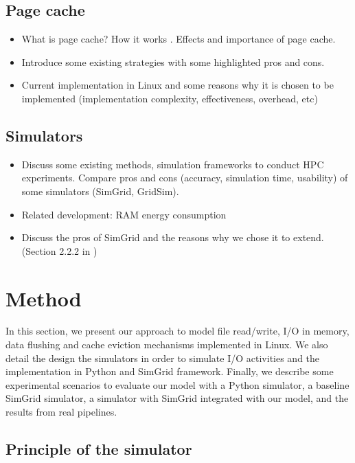 \documentclass[conference]{IEEEtran}
\begin{document}
		\subsection{Page cache}
			\begin{itemize}
				\item What is page cache? How it works \cite{linuxdev3rd2010}. Effects and importance of page cache.
				\item Introduce some existing strategies with some highlighted pros and cons.
				\item Current implementation in Linux and some reasons why it is chosen to be implemented (implementation complexity, effectiveness, overhead, etc) \cite{linuxdev3rd2010}
			\end{itemize}									

		\subsection{Simulators}
			\begin{itemize}
				\item Discuss some existing methods, simulation frameworks to conduct HPC experiments. Compare pros and cons (accuracy, simulation time, usability) of some simulators (SimGrid, GridSim).
				\item Related development: RAM energy consumption \cite{gill2019} \cite{ouarnoughi2017} 
				\item Discuss the pros of SimGrid and the reasons why we chose it to extend. (Section 2.2.2 in \cite{casanova2014})
			\end{itemize}
			
	\section{Method}
		In this section, we present our approach to model file read/write, 
		I/O in memory, data flushing and cache eviction mechanisms 
		implemented in Linux. 
		We also detail the design the simulators in order to simulate I/O activities 
		and the implementation in Python and SimGrid framework. 
		Finally, we describe some experimental scenarios to evaluate our model 
		with a Python simulator, a baseline SimGrid simulator, a simulator 
		with SimGrid integrated with our model, and the results from real pipelines.

		\subsection{Principle of the simulator}
	
\end{document}
